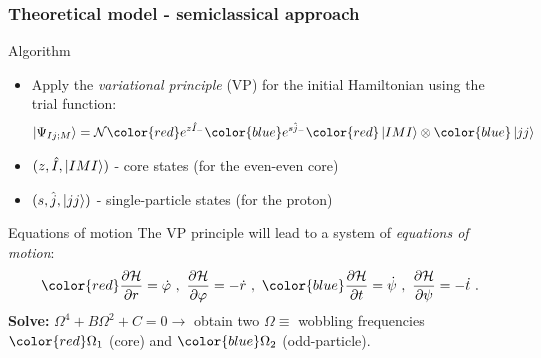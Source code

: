 \documentclass[
	11pt, %
]{beamer}
\begin{document}
\begin{frame}
	\frametitle{Theoretical model - semiclassical approach}
	\vspace{-0.5cm}
	\begin{block}{Algorithm}
		\begin{itemize}
			\item Apply the \emph{variational principle} (VP) for the initial Hamiltonian using the trial function:
			\vspace{-0.5cm}
			\begin{align}
				\ket{\Psi_{Ij;M}}=\mathcal{N}{\color{red}e^{z\hat{I}_-}}{\color{blue}e^{s\hat{j}_-}}{\color{red}\ket{IMI}}\otimes{\color{blue}\ket{jj}}
			\end{align}
			\item $(z,\hat{I},\ket{IMI})$ - core states (for the even-even core)
			\item $(s,\hat{j},\ket{jj})$ - single-particle states (for the proton)
		\end{itemize}
	\end{block}
	\vspace{-0.2cm}
	\begin{exampleblock}{Equations of motion}
		The VP principle will lead to a system of \emph{equations of motion}:
		\begin{align}
			{\color{red}\frac{\partial\mathcal{H}}{\partial r}=\dot{\varphi}\ ,\ \frac{\partial\mathcal{H}}{\partial \varphi}=-\dot{r}}\ ,\ {\color{blue}\frac{\partial\mathcal{H}}{\partial t}=\dot{\psi}\ ,\ \frac{\partial\mathcal{H}}{\partial \psi}=-\dot{t}}\ .
		\end{align}
		\textbf{Solve:} $\Omega^4+B\Omega^2+C=0 \longrightarrow$ obtain two $\Omega\equiv$ wobbling frequencies ${\color{red}\Omega_1}$ (core) and ${\color{blue}\Omega_2}$ (odd-particle).
	\end{exampleblock}
\end{frame}
\end{document}
